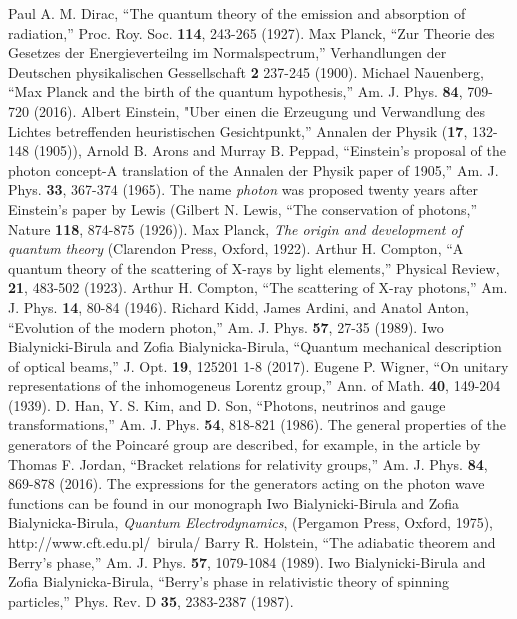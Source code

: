 \documentclass[onecolumn,aps,pra,12pt]{revtex4-1}
\begin{document}
\begin{thebibliography}{00}
 Paul A. M. Dirac, ``The quantum theory of the emission and absorption of radiation,'' Proc. Roy. Soc. {\bf 114}, 243-265 (1927).
 Max Planck, ``Zur Theorie des Gesetzes der Energieverteilng im Normalspectrum,'' Verhandlungen der Deutschen physikalischen Gessellschaft {\bf 2} 237-245 (1900).
 Michael Nauenberg, ``Max Planck and the birth of the quantum hypothesis,'' Am. J. Phys. {\bf 84}, 709-720 (2016).
 Albert Einstein, "Uber einen die Erzeugung und Verwandlung des Lichtes betreffenden heuristischen Gesichtpunkt,'' Annalen der Physik ({\bf 17}, 132-148 (1905)), Arnold B. Arons and Murray B. Peppad, ``Einstein's proposal of the photon concept-A translation of the Annalen der Physik paper of 1905,'' Am. J. Phys. {\bf 33}, 367-374 (1965).
 The name {\em photon} was proposed twenty years after Einstein's paper  by Lewis (Gilbert N. Lewis, ``The conservation of photons,'' Nature {\bf 118}, 874-875 (1926)).
 Max Planck, {\em The origin and development of quantum theory} (Clarendon Press, Oxford, 1922).
 Arthur H. Compton, ``A quantum theory of the scattering of X-rays by light elements,'' Physical Review, {\bf 21}, 483-502 (1923).
 Arthur H. Compton, ``The scattering of X-ray photons,'' Am. J. Phys. {\bf 14}, 80-84 (1946).
 Richard Kidd, James Ardini, and Anatol Anton,  ``Evolution of the modern photon,'' Am. J. Phys. {\bf 57}, 27-35 (1989).
 Iwo Bialynicki-Birula and Zofia Bialynicka-Birula, ``Quantum mechanical description of optical beams,'' J. Opt. {\bf 19}, 125201 1-8 (2017).
 Eugene P. Wigner, ``On unitary representations of the inhomogeneus Lorentz group,'' Ann. of Math. {\bf 40}, 149-204 (1939).
 D. Han, Y. S. Kim, and D. Son, ``Photons, neutrinos and gauge transformations,'' Am. J. Phys. {\bf 54}, 818-821 (1986).
 The general properties of the generators of the Poincar\'e group are described, for example, in the article by Thomas F. Jordan, ``Bracket relations for relativity groups,'' Am. J. Phys. {\bf 84}, 869-878 (2016).
 The expressions for the generators acting on the photon wave functions can be found in our monograph Iwo Bialynicki-Birula and Zofia Bialynicka-Birula, {\em Quantum Electrodynamics}, (Pergamon Press, Oxford, 1975), http://www.cft.edu.pl/~birula/
 Barry R. Holstein, ``The adiabatic theorem and Berry’s phase,'' Am. J. Phys. {\bf 57}, 1079-1084 (1989).
 Iwo Bialynicki-Birula and Zofia Bialynicka-Birula, ``Berry's phase in relativistic theory of spinning particles,'' Phys. Rev. D {\bf 35}, 2383-2387 (1987).

\end{thebibliography}
\end{document}
